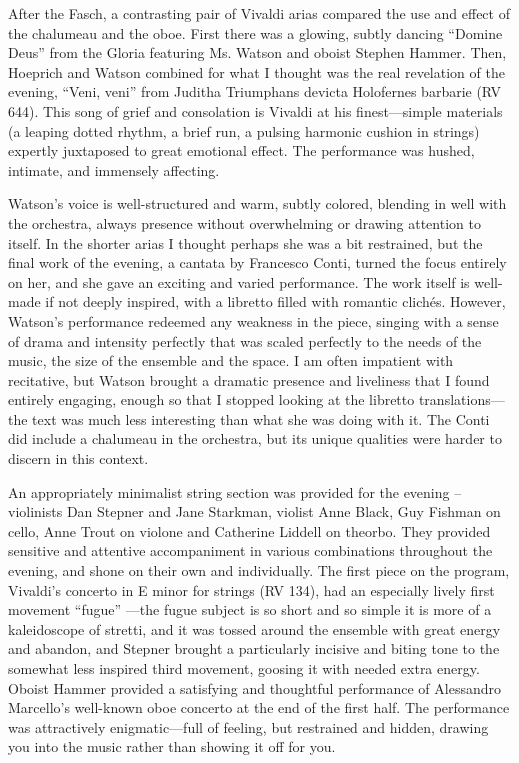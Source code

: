 After the Fasch, a contrasting pair of Vivaldi arias compared the use and effect of the chalumeau and the oboe. First there was a glowing, subtly dancing “Domine Deus” from the Gloria featuring Ms. Watson and oboist Stephen Hammer. Then, Hoeprich and Watson combined for what I thought was the real revelation of the evening, “Veni, veni” from Juditha Triumphans devicta Holofernes barbarie (RV 644). This song of grief and consolation is Vivaldi at his finest—simple materials (a leaping dotted rhythm, a brief run, a pulsing harmonic cushion in strings) expertly juxtaposed to great emotional effect. The performance was hushed, intimate, and immensely affecting.

Watson’s voice is well-structured and warm, subtly colored, blending in well with the orchestra, always presence without overwhelming or drawing attention to itself. In the shorter arias I thought perhaps she was a bit restrained, but the final work of the evening, a cantata by Francesco Conti, turned the focus entirely on her, and she gave an exciting and varied performance. The work itself is well-made if not deeply inspired, with a libretto filled with romantic clichés. However, Watson’s performance redeemed any weakness in the piece, singing with a sense of drama and intensity perfectly that was scaled perfectly to the needs of the music, the size of the ensemble and the space. I am often impatient with recitative, but Watson brought a dramatic presence and liveliness that I found entirely engaging, enough so that I stopped looking at the libretto translations—the text was much less interesting than what she was doing with it. The Conti did include a chalumeau in the orchestra, but its unique qualities were harder to discern in this context.

An appropriately minimalist string section was provided for the evening – violinists Dan Stepner and Jane Starkman, violist Anne Black, Guy Fishman on cello, Anne Trout on violone and Catherine Liddell on theorbo. They provided sensitive and attentive accompaniment in various combinations throughout the evening, and shone on their own and individually. The first piece on the program, Vivaldi’s concerto in E minor for strings (RV 134), had an especially lively first movement “fugue” —the fugue subject is so short and so simple it is more of a kaleidoscope of stretti, and it was tossed around the ensemble with great energy and abandon, and Stepner brought a particularly incisive and biting tone to the somewhat less inspired third movement, goosing it with needed extra energy.  Oboist Hammer provided a satisfying and thoughtful performance of Alessandro Marcello’s well-known oboe concerto at the end of the first half. The performance was attractively enigmatic—full of feeling, but restrained and hidden, drawing you into the music rather than showing it off for you.

